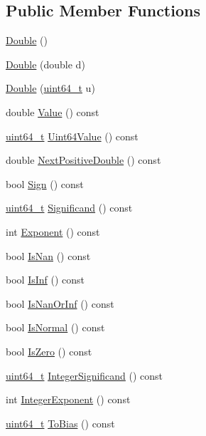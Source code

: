 \subsection*{Public Member Functions}
\begin{DoxyCompactItemize}
\item 
\hyperlink{classinternal_1_1Double_a98e2cff9880cd032d174e9721ae40ddd}{Double} ()
\item 
\hyperlink{classinternal_1_1Double_ad66f3b914570ce62e9f16083117f3e4f}{Double} (double d)
\item 
\hyperlink{classinternal_1_1Double_a293a7ca841d847ea3e83ffa28b68601f}{Double} (\hyperlink{stdint_8h_aec6fcb673ff035718c238c8c9d544c47}{uint64\+\_\+t} u)
\item 
double \hyperlink{classinternal_1_1Double_a665c64824d1046528cbc4066a9ed0ef8}{Value} () const
\item 
\hyperlink{stdint_8h_aec6fcb673ff035718c238c8c9d544c47}{uint64\+\_\+t} \hyperlink{classinternal_1_1Double_a1a35be6344c886f159cb36a1498a62ac}{Uint64\+Value} () const
\item 
double \hyperlink{classinternal_1_1Double_a6ffee23d82d9c606b1a53ed87e393e90}{Next\+Positive\+Double} () const
\item 
bool \hyperlink{classinternal_1_1Double_ab09c26873ca4c3e471a97c4559bf317d}{Sign} () const
\item 
\hyperlink{stdint_8h_aec6fcb673ff035718c238c8c9d544c47}{uint64\+\_\+t} \hyperlink{classinternal_1_1Double_ade5d3e893dd6884ccd37632109dae1a6}{Significand} () const
\item 
int \hyperlink{classinternal_1_1Double_ae091055d96d8730f654170613f2cf265}{Exponent} () const
\item 
bool \hyperlink{classinternal_1_1Double_a312312ab2798ee85cbd0e739fcefa386}{Is\+Nan} () const
\item 
bool \hyperlink{classinternal_1_1Double_afe1ce48f7fb9797e1a2044c58a6b226c}{Is\+Inf} () const
\item 
bool \hyperlink{classinternal_1_1Double_a8b9a82e8b99783b7e98b5307756021c0}{Is\+Nan\+Or\+Inf} () const
\item 
bool \hyperlink{classinternal_1_1Double_a8a39cd42010c69681da35d87f1331381}{Is\+Normal} () const
\item 
bool \hyperlink{classinternal_1_1Double_a90a3a1ca614b377b59576955ce987ce2}{Is\+Zero} () const
\item 
\hyperlink{stdint_8h_aec6fcb673ff035718c238c8c9d544c47}{uint64\+\_\+t} \hyperlink{classinternal_1_1Double_a1bf89d77be843f69facec9f2bc4dbc72}{Integer\+Significand} () const
\item 
int \hyperlink{classinternal_1_1Double_a9721e0fdedef4d0fe6c7b411492a88fb}{Integer\+Exponent} () const
\item 
\hyperlink{stdint_8h_aec6fcb673ff035718c238c8c9d544c47}{uint64\+\_\+t} \hyperlink{classinternal_1_1Double_ab3d3a81274e4f4b9b415db7c664d3ac9}{To\+Bias} () const
\end{DoxyCompactItemize}
